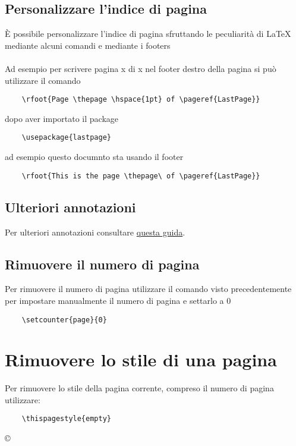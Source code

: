 \documentclass[a4paper, 12pt]{article}
\begin{document}
\setcounter{page}{5} %



\subsection{Personalizzare l'indice di pagina}

È possibile personalizzare l'indice di pagina sfruttando le peculiarità di \LaTeX\\ mediante alcuni comandi e mediante i footers
\\\\
Ad esempio per scrivere pagina x di x nel footer destro della pagina si può utilizzare il comando
\begin{verbatim}
    \rfoot{Page \thepage \hspace{1pt} of \pageref{LastPage}}
\end{verbatim}

dopo aver importato il package
\begin{verbatim}
    \usepackage{lastpage}
\end{verbatim}

ad esempio questo documnto sta usando il footer
\begin{verbatim}
    \rfoot{This is the page \thepage\ of \pageref{LastPage}}
\end{verbatim}

\subsection{Ulteriori annotazioni}

Per ulteriori annotazioni consultare \href{https://it.sharelatex.com/learn/Headers_and_footers}{questa guida}.

\subsection{Rimuovere il numero di pagina}

Per rimuovere il numero di pagina utilizzare il comando visto precedentemente\\ per impostare manualmente il numero di pagina e settarlo a 0
\begin{verbatim}
    \setcounter{page}{0}
\end{verbatim}


\vspace{2cm}

\section{Rimuovere lo stile di una pagina}

Per rimuovere lo stile della pagina corrente, compreso il numero di pagina utilizzare:
\begin{verbatim}
    \thispagestyle{empty}
\end{verbatim}





\vspace{4cm}
\begin{center}
{\selectfont
\copyright {}
}
\end{center}
\end{document}
